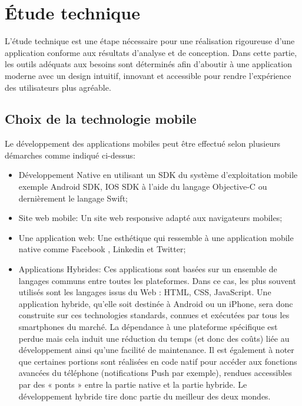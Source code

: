 \section{\'Etude technique}

L'étude technique est une étape nécessaire pour une réalisation rigoureuse d’une application conforme aux résultats d'analyse et de conception. Dans cette partie, les outils adéquats aux besoins sont déterminés afin d'aboutir à une application moderne avec un design intuitif, innovant et accessible pour rendre l'expérience des utilisateurs plus agréable.

\subsection{Choix de la technologie mobile}

Le développement des applications mobiles peut être effectué selon plusieurs démarches comme indiqué ci-dessus:

\vspace{6pt}
\paragraphmark

\begin{itemize}
	\item Développement Native en utilisant un SDK du système d’exploitation mobile exemple Android SDK, IOS SDK à l’aide du langage Objective-C ou dernièrement le langage Swift;
	\item Site web mobile: Un site web responsive adapté aux navigateurs mobiles;
	\item Une application web: Une esthétique qui ressemble à une application mobile native comme Facebook , Linkedin et Twitter;
	\newpage
	\item Applications Hybrides: Ces applications sont basées sur un ensemble de langages communs entre toutes les plateformes. Dans ce cas, les plus souvent utilisés sont les langages issus du Web : HTML, CSS, JavaScript. Une application hybride, qu’elle soit destinée à Android ou un iPhone, sera donc construite sur ces technologies standards, connues et exécutées par tous les smartphones du marché. La dépendance à une plateforme spécifique est perdue mais cela induit une réduction du temps (et donc des coûts) liée au développement ainsi qu’une facilité de maintenance. Il est également à noter que certaines portions sont réalisées en code natif pour accéder aux fonctions avancées du téléphone (notifications Push par exemple), rendues accessibles par des « ponts » entre la partie native et la partie hybride. Le développement hybride tire donc partie du meilleur des deux mondes.
\end{itemize}

